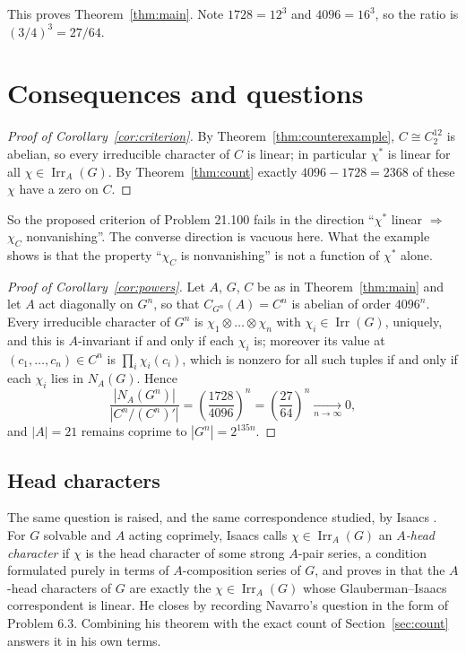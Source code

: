 \documentclass[11pt]{article}
\theoremstyle{definition}
\theoremstyle{remark}
\newcommand{\Irr}{\operatorname{Irr}}
\begin{document}
This proves Theorem~\ref{thm:main}.  Note $1728=12^3$ and $4096=16^3$,
so the ratio is $(3/4)^3=27/64$.

\section{Consequences and questions}\label{sec:consequences}

\begin{proof}[Proof of Corollary~\ref{cor:criterion}]
By Theorem~\ref{thm:counterexample}, $C\cong C_2^{12}$ is abelian, so
every irreducible character of $C$ is linear; in particular $\chi^*$ is
linear for all $\chi\in\Irr_A(G)$.  By Theorem~\ref{thm:count} exactly
$4096-1728=2368$ of these $\chi$ have a zero on $C$.
\end{proof}

So the proposed criterion of Problem 21.100 fails in the
direction ``$\chi^*$ linear $\Rightarrow$ $\chi_C$ nonvanishing''.  The
converse direction is vacuous here.  What the example shows is that the
property ``$\chi_C$ is nonvanishing'' is not a function of $\chi^*$
alone.

\begin{proof}[Proof of Corollary~\ref{cor:powers}]
Let $A$, $G$, $C$ be as in Theorem~\ref{thm:main} and let $A$ act
diagonally on $G^n$, so that $C_{G^n}(A)=C^n$ is abelian of order
$4096^n$.  Every irreducible character of $G^n$ is
$\chi_1\otimes\dots\otimes\chi_n$ with $\chi_i\in\Irr(G)$, uniquely, and
this is $A$-invariant if and only if each $\chi_i$ is; moreover its
value at $(c_1,\dots,c_n)\in C^n$ is $\prod_i\chi_i(c_i)$, which is
nonzero for all such tuples if and only if each $\chi_i$ lies in
$N_A(G)$.  Hence
\[
 \frac{|N_A(G^n)|}{|C^n/(C^n)'|}
 =\left(\frac{1728}{4096}\right)^{\!n}
 =\left(\frac{27}{64}\right)^{\!n}
 \xrightarrow[n\to\infty]{}0 ,
\]
and $|A|=21$ remains coprime to $|G^n|=2^{135n}$.
\end{proof}

\subsection*{Head characters}

The same question is raised, and the same
correspondence studied, by Isaacs \cite{isaacs-carter}.  For $G$
solvable and $A$ acting coprimely, Isaacs calls $\chi\in\Irr_A(G)$ an
\emph{$A$-head character} if $\chi$ is the head character of some strong
$A$-pair series, a condition formulated purely in terms of
$A$-composition series of $G$, and proves in
\cite[Theorem 7.1]{isaacs-carter} that the $A$-head characters of $G$
are exactly the $\chi\in\Irr_A(G)$ whose Glauberman--Isaacs
correspondent is linear.  He closes \cite[\S7]{isaacs-carter} by
recording Navarro's question in the form of Problem 6.3.  Combining his
theorem with the exact count of Section~\ref{sec:count} answers it in
his own terms.
\end{document}
